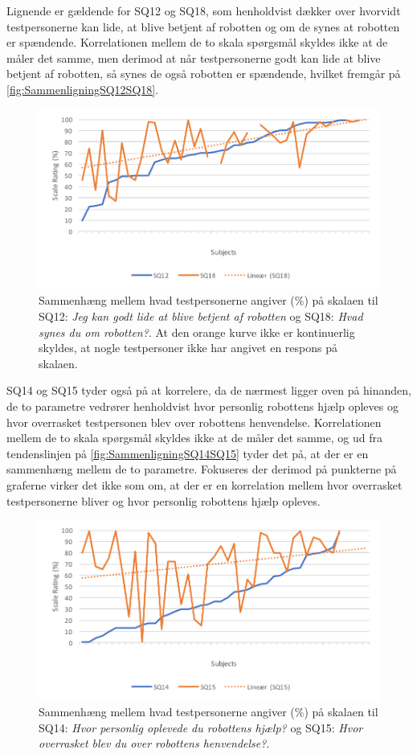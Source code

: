 Lignende er gældende for SQ12 og SQ18, som henholdvist dækker over hvorvidt testpersonerne kan lide, at blive betjent af robotten og om de synes at robotten er spændende. Korrelationen mellem de to skala spørgsmål skyldes ikke at de måler det samme, men derimod at når testpersonerne godt kan lide at blive betjent af robotten, så synes de også robotten er spændende, hvilket fremgår på \autoref{fig:SammenligningSQ12SQ18}. 
%
\begin{figure}[H]
	\centering
	\includegraphics[width=\textwidth]{Figure/Korrelationsgrafer/SQ12+SQ18}
	\caption{Sammenhæng mellem hvad testpersonerne angiver (\%) på skalaen til SQ12: \textit{Jeg kan godt lide at blive betjent af robotten} og SQ18: \textit{Hvad synes du om robotten?}. At den orange kurve ikke er kontinuerlig skyldes, at nogle testpersoner ikke har angivet en respons på skalaen.}
	\label{fig:SammenligningSQ12SQ18}
\end{figure}
\noindent
%
SQ14 og SQ15 tyder også på at korrelere, da de nærmest ligger oven på hinanden, de to parametre vedrører henholdvist hvor personlig robottens hjælp opleves og hvor overrasket testpersonen blev over robottens henvendelse. Korrelationen mellem de to skala spørgsmål skyldes ikke at de måler det samme, og ud fra tendenslinjen på \autoref{fig:SammenligningSQ14SQ15} tyder det på, at der er en sammenhæng mellem de to parametre. Fokuseres der derimod på punkterne på graferne virker det ikke som om, at der er en korrelation mellem hvor overrasket testpersonerne bliver og hvor personlig robottens hjælp opleves.
%
\begin{figure}[H]
	\centering
	\includegraphics[width=\textwidth]{Figure/Korrelationsgrafer/SQ14+SQ15}
	\caption{Sammenhæng mellem hvad testpersonerne angiver (\%) på skalaen til SQ14: \textit{Hvor personlig oplevede du robottens hjælp?} og SQ15: \textit{Hvor overrasket blev du over robottens henvendelse?}.}
	\label{fig:SammenligningSQ14SQ15}
\end{figure}
